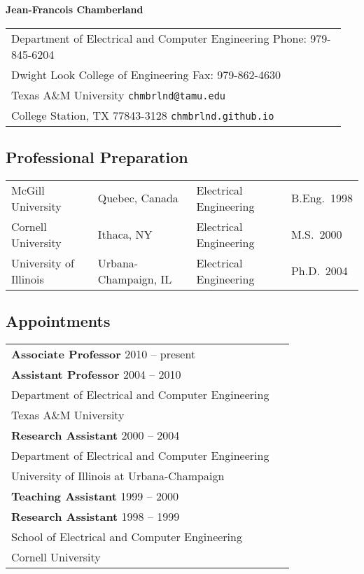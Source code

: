 \documentclass[11pt]{article}
\begin{document}
\begin{center}
{\bfseries \Large Jean-Francois Chamberland}
\end{center}

\begin{center}
\begin{tabular}{p{0.95\linewidth}}
Department of Electrical and Computer Engineering
\hfill Phone: 979-845-6204 \\
Dwight Look College of Engineering
\hfill Fax: 979-862-4630 \\
Texas A\&M University
\hfill \texttt{chmbrlnd@tamu.edu} \\
College Station, TX 77843-3128
\hfill \texttt{chmbrlnd.github.io}
\end{tabular}
\end{center}


\subsection*{Professional Preparation}

\begin{center}
\begin{tabular}{llll}
McGill University & Quebec, Canada & Electrical Engineering & B.Eng.~1998 \\
Cornell University & Ithaca, NY & Electrical Engineering & M.S.~2000 \\
University of Illinois & Urbana-Champaign, IL & Electrical Engineering &
Ph.D.~2004 \\
\end{tabular}
\end{center}

\subsection*{Appointments}

\begin{center}
\begin{tabular}{p{0.95\linewidth}}
\textbf{Associate Professor} \hfill 2010 -- present \\
\textbf{Assistant Professor} \hfill 2004 -- 2010 \\
Department of Electrical and Computer Engineering \\
Texas A\&M University \\[4pt]
\textbf{Research Assistant} \hfill 2000 -- 2004 \\
Department of Electrical and Computer Engineering \\
University of Illinois at Urbana-Champaign \\[4pt]
\textbf{Teaching Assistant} \hfill 1999 -- 2000 \\
\textbf{Research Assistant} \hfill 1998 -- 1999 \\
School of Electrical and Computer Engineering \\
Cornell University
\end{tabular}
\end{center}
\end{document}
